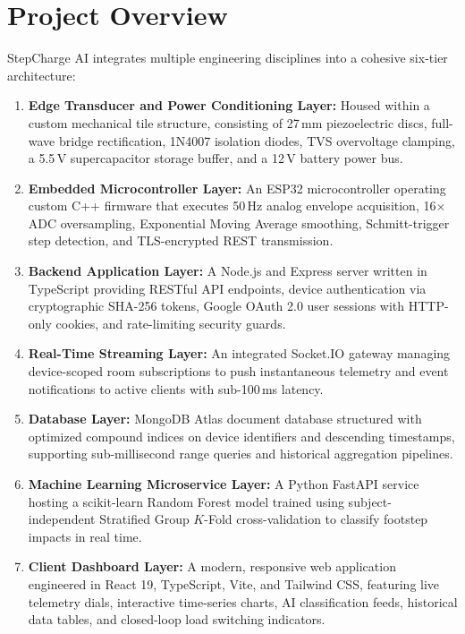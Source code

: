 \section{Project Overview}
StepCharge AI integrates multiple engineering disciplines into a cohesive six-tier architecture:
\begin{enumerate}
    \item \textbf{Edge Transducer and Power Conditioning Layer:} Housed within a custom mechanical tile structure, consisting of 27\,mm piezoelectric discs, full-wave bridge rectification, 1N4007 isolation diodes, TVS overvoltage clamping, a 5.5\,V supercapacitor storage buffer, and a 12\,V battery power bus.
    \item \textbf{Embedded Microcontroller Layer:} An ESP32 microcontroller operating custom C++ firmware that executes 50\,Hz analog envelope acquisition, 16$\times$ ADC oversampling, Exponential Moving Average smoothing, Schmitt-trigger step detection, and TLS-encrypted REST transmission.
    \item \textbf{Backend Application Layer:} A Node.js and Express server written in TypeScript providing RESTful API endpoints, device authentication via cryptographic SHA-256 tokens, Google OAuth 2.0 user sessions with HTTP-only cookies, and rate-limiting security guards.
    \item \textbf{Real-Time Streaming Layer:} An integrated Socket.IO gateway managing device-scoped room subscriptions to push instantaneous telemetry and event notifications to active clients with sub-100\,ms latency.
    \item \textbf{Database Layer:} MongoDB Atlas document database structured with optimized compound indices on device identifiers and descending timestamps, supporting sub-millisecond range queries and historical aggregation pipelines.
    \item \textbf{Machine Learning Microservice Layer:} A Python FastAPI service hosting a scikit-learn Random Forest model trained using subject-independent Stratified Group $K$-Fold cross-validation to classify footstep impacts in real time.
    \item \textbf{Client Dashboard Layer:} A modern, responsive web application engineered in React 19, TypeScript, Vite, and Tailwind CSS, featuring live telemetry dials, interactive time-series charts, AI classification feeds, historical data tables, and closed-loop load switching indicators.
\end{enumerate}


